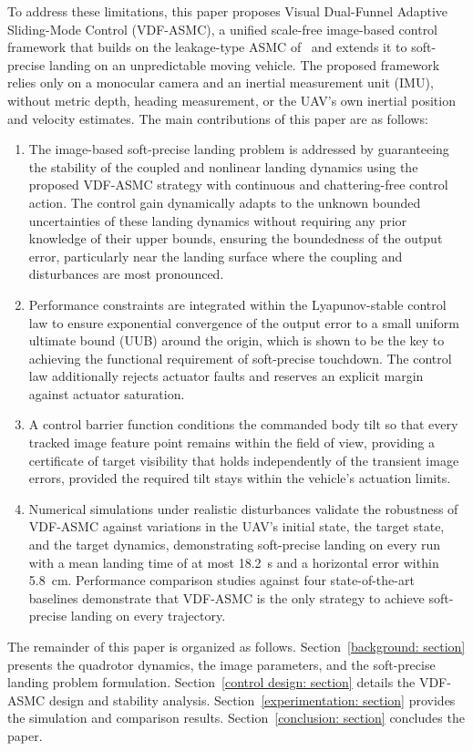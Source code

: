 \documentclass{IEEEtaes}
\begin{document}
To address these limitations, this paper proposes Visual Dual-Funnel Adaptive Sliding-Mode Control (VDF-ASMC), a unified scale-free image-based control framework that builds on the leakage-type ASMC of~\cite{singhal2025} and extends it to soft-precise landing on an unpredictable moving vehicle. The proposed framework relies only on a monocular camera and an inertial measurement unit (IMU), without metric depth, heading measurement, or the UAV's own inertial position and velocity estimates. The main contributions of this paper are as follows:
\begin{enumerate}
\item The image-based soft-precise landing problem is addressed by guaranteeing the stability of the coupled and nonlinear landing dynamics using the proposed VDF-ASMC strategy with continuous and chattering-free control action. The control gain dynamically adapts to the unknown bounded uncertainties of these landing dynamics without requiring any prior knowledge of their upper bounds, ensuring the boundedness of the output error, particularly near the landing surface where the coupling and disturbances are most pronounced.
\item Performance constraints are integrated within the Lyapunov-stable control law to ensure exponential convergence of the output error to a small uniform ultimate bound (UUB) around the origin, which is shown to be the key to achieving the functional requirement of soft-precise touchdown. The control law additionally rejects actuator faults and reserves an explicit margin against actuator saturation.
\item A control barrier function conditions the commanded body tilt so that every tracked image feature point remains within the field of view, providing a certificate of target visibility that holds independently of the transient image errors, provided the required tilt stays within the vehicle's actuation limits.
\item Numerical simulations under realistic disturbances validate the robustness of VDF-ASMC against variations in the UAV's initial state, the target state, and the target dynamics, demonstrating soft-precise landing on every run with a mean landing time of at most 18.2~s and a horizontal error within 5.8~cm. Performance comparison studies against four state-of-the-art baselines demonstrate that VDF-ASMC is the only strategy to achieve soft-precise landing on every trajectory.
\end{enumerate}
The remainder of this paper is organized as follows. Section~\ref{background: section} presents the quadrotor dynamics, the image parameters, and the soft-precise landing problem formulation. Section~\ref{control design: section} details the VDF-ASMC design and stability analysis. Section~\ref{experimentation: section} provides the simulation and comparison results. Section~\ref{conclusion: section} concludes the paper.
\end{document}
